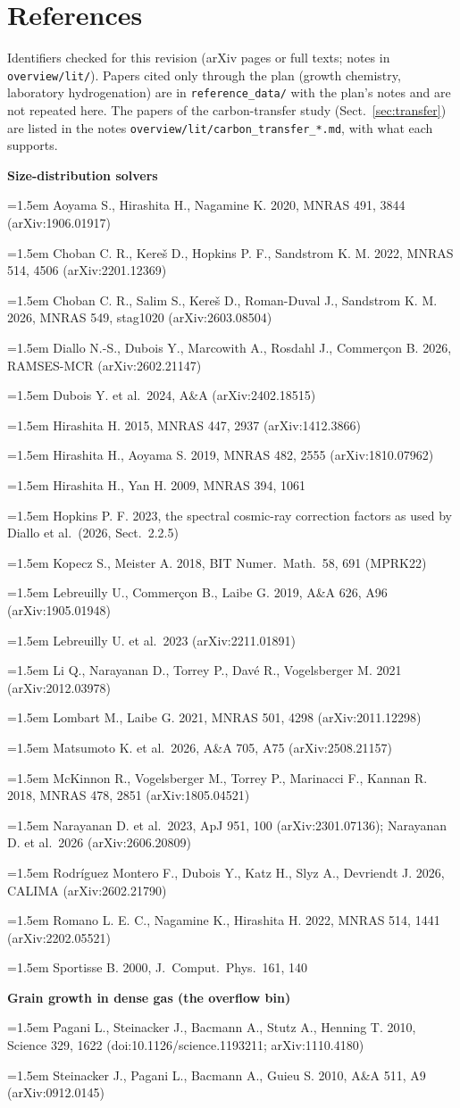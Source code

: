 \documentclass[11pt,a4paper]{article}
\begin{document}
\section{References}
{\footnotesize
\setlength{\parindent}{0pt}
\newcommand{\rf}[1]{\par\hangindent=1.5em #1}
Identifiers checked for this revision (arXiv pages or full texts; notes in \texttt{overview/lit/}). Papers cited
only through the plan (growth chemistry, laboratory hydrogenation) are in \texttt{reference\_data/} with the plan's
notes and are not repeated here. The papers of the carbon-transfer study (Sect.~\ref{sec:transfer}) are listed in the
notes \texttt{overview/lit/carbon\_transfer\_*.md}, with what each supports.

\medskip\textbf{Size-distribution solvers}
\rf{Aoyama S., Hirashita H., Nagamine K. 2020, MNRAS 491, 3844 (arXiv:1906.01917)}
\rf{Choban C. R., Kere\v{s} D., Hopkins P. F., Sandstrom K. M. 2022, MNRAS 514, 4506 (arXiv:2201.12369)}
\rf{Choban C. R., Salim S., Kere\v{s} D., Roman-Duval J., Sandstrom K. M. 2026, MNRAS 549, stag1020 (arXiv:2603.08504)}
\rf{Diallo N.-S., Dubois Y., Marcowith A., Rosdahl J., Commer\c{c}on B. 2026, RAMSES-MCR (arXiv:2602.21147)}
\rf{Dubois Y. et al.\ 2024, A\&A (arXiv:2402.18515)}
\rf{Hirashita H. 2015, MNRAS 447, 2937 (arXiv:1412.3866)}
\rf{Hirashita H., Aoyama S. 2019, MNRAS 482, 2555 (arXiv:1810.07962)}
\rf{Hirashita H., Yan H. 2009, MNRAS 394, 1061}
\rf{Hopkins P. F. 2023, the spectral cosmic-ray correction factors as used by Diallo et al.\ (2026, Sect.~2.2.5)}
\rf{Kopecz S., Meister A. 2018, BIT Numer.\ Math.\ 58, 691 (MPRK22)}
\rf{Lebreuilly U., Commer\c{c}on B., Laibe G. 2019, A\&A 626, A96 (arXiv:1905.01948)}
\rf{Lebreuilly U. et al.\ 2023 (arXiv:2211.01891)}
\rf{Li Q., Narayanan D., Torrey P., Dav\'e R., Vogelsberger M. 2021 (arXiv:2012.03978)}
\rf{Lombart M., Laibe G. 2021, MNRAS 501, 4298 (arXiv:2011.12298)}
\rf{Matsumoto K. et al.\ 2026, A\&A 705, A75 (arXiv:2508.21157)}
\rf{McKinnon R., Vogelsberger M., Torrey P., Marinacci F., Kannan R. 2018, MNRAS 478, 2851 (arXiv:1805.04521)}
\rf{Narayanan D. et al.\ 2023, ApJ 951, 100 (arXiv:2301.07136); Narayanan D. et al.\ 2026 (arXiv:2606.20809)}
\rf{Rodr\'iguez Montero F., Dubois Y., Katz H., Slyz A., Devriendt J. 2026, CALIMA (arXiv:2602.21790)}
\rf{Romano L. E. C., Nagamine K., Hirashita H. 2022, MNRAS 514, 1441 (arXiv:2202.05521)}
\rf{Sportisse B. 2000, J.\ Comput.\ Phys.\ 161, 140}

\medskip\textbf{Grain growth in dense gas (the overflow bin)}
\rf{Pagani L., Steinacker J., Bacmann A., Stutz A., Henning T. 2010, Science 329, 1622 (doi:10.1126/science.1193211; arXiv:1110.4180)}
\rf{Steinacker J., Pagani L., Bacmann A., Guieu S. 2010, A\&A 511, A9 (arXiv:0912.0145)}

}
\end{document}
